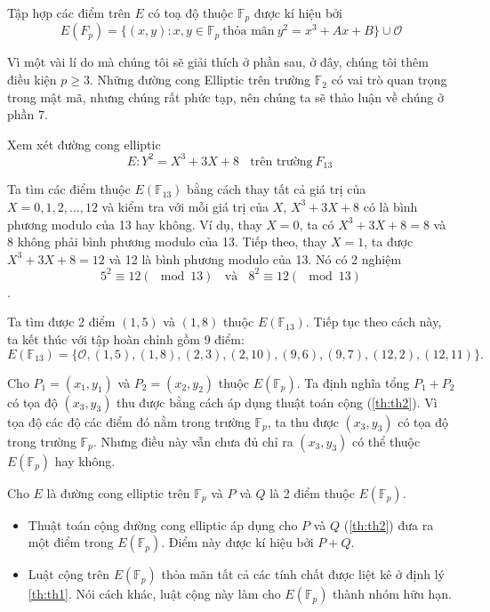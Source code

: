 Tập hợp các điểm trên $E$ có toạ độ thuộc $\mathbb{F} _p$ được kí hiệu bởi
$$E(F_p) = \{(x, y) : x, y \in \mathbb{F}_p\ \text{thỏa mãn}\ y^2 = x^3 + A x + B\} \cup \mathcal{O}$$

\begin{remark}
	Vì một vài lí do mà chúng tôi sẽ giải thích ở phần sau, ở đây, chúng tôi thêm điều kiện $p \geq 3$.
	Những đường cong Elliptic trên trường $\mathbb{F}_2$ có vai trò quan trọng trong mật mã, nhưng chúng rất phức tạp, nên chúng ta sẽ thảo luận về chúng ở phần 7.
\end{remark}

\begin{example}
	\label{ex:ex4}
	Xem xét đường cong elliptic
	$$E: Y^2 = X^3 + 3X + 8 \ \ \ \ \text{trên trường}\  F_{13}\ $$
\end{example}

Ta tìm các điểm thuộc $E(\mathbb{F}_{13})$ bằng cách thay tất cả giá trị của $X = 0,1,2,\ldots,12$ và kiểm tra với mỗi giá trị của $X$, $X^3 + 3X + 8$ có là bình phương modulo của 13 hay không.
Ví dụ, thay $X = 0$, ta có $X^3+3X+8 = 8$ và 8 không phải bình phương modulo của 13.
Tiếp theo, thay $X = 1$, ta được $X^3+3X+8 = 12$ và 12 là bình phương modulo của 13. Nó có 2 nghiệm
$$5^2 \equiv 12 (\mod{13}) \ \ \ \ \text{và} \ \ \ \ 8^2 \equiv 12 (\mod 13)$$.

Ta tìm được 2 điểm $(1,5)$ và $(1,8)$ thuộc $E(\mathbb{F}_{13})$. Tiếp tục theo cách này, ta kết thúc với tập hoàn chỉnh gồm 9 điểm:
$$E(\mathbb{F}_{13}) = \{ \mathcal{O}, (1,5), (1,8), (2,3), (2,10), (9,6), (9,7), (12,2), (12,11)\}.$$

Cho $P_1 = (x_1, y_1)$ và $P_2 = (x_2, y_2)$ thuộc $E(\mathbb{F}_{p})$. Ta định nghĩa tổng $P_1+P_2$ có tọa độ $(x_3, y_3)$ thu được bằng cách áp dụng thuật toán cộng (\ref{th:th2}).
Vì tọa độ các độ các điểm đó nằm trong trường $\mathbb{F}_p$, ta thu được $(x_3, y_3)$ có tọa độ trong trường $\mathbb{F}_p$. Nhưng điều này vẫn chưa đủ chỉ ra
$(x_3, y_3)$ có thể thuộc $E(\mathbb{F}_{p})$ hay không.

\begin{theorem}
	\label{th:th3}
	Cho $E$ là đường cong elliptic trên $\mathbb{F}_p$ và $P$ và $Q$ là 2 điểm thuộc $E(\mathbb{F}_{p})$.
	\begin{itemize}
		\item Thuật toán cộng đường cong elliptic áp dụng cho $P$ và $Q$ (\ref{th:th2}) đưa ra một điểm trong $E(\mathbb{F}_{p})$.
		      Điểm này được kí hiệu bởi $P + Q$.
		\item Luật cộng trên $E(\mathbb{F}_{p})$ thỏa mãn tất cả các tính chất được liệt kê ở định lý \ref{th:th1}.
		      Nói cách khác, luật cộng này làm cho $E(\mathbb{F}_{p})$ thành nhóm hữu hạn.
	\end{itemize}
\end{theorem}

